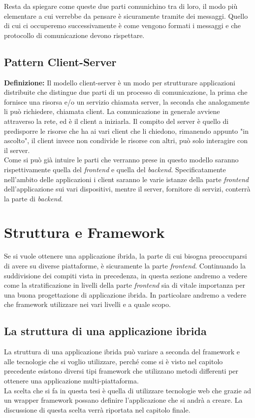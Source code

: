 Resta da spiegare come queste due parti comunichino tra di loro, il modo più elementare a cui verrebbe da pensare è sicuramente tramite dei messaggi. Quello di cui ci occuperemo successivamente è come vengono formati i messaggi e che protocollo di comunicazione devono rispettare.
\subsection{Pattern Client-Server}
\textbf{Definizione:} Il modello client-server è un modo per strutturare applicazioni distribuite che distingue due parti di un processo di comunicazione, la prima che fornisce una risorsa e/o un servizio chiamata server, la seconda che analogamente li può richiedere, chiamata client. La comunicazione in generale avviene attraverso la rete, ed è il client a iniziarla. Il compito del server è quello di predisporre le risorse che ha ai vari client che li chiedono, rimanendo appunto "in ascolto", il client invece non condivide le risorse con altri, può solo interagire con il server\cite{wiki:cliserv}.\\

Come si può già intuire le parti che verranno prese in questo modello saranno rispettivamente quella del \emph{frontend} e quella del \emph{backend}. Specificatamente nell'ambito delle applicazioni i client saranno le varie istanze della parte \emph{frontend} dell'applicazione sui vari dispositivi, mentre il server, fornitore di servizi, conterrà la parte di \emph{backend}.

\section{Struttura e Framework}
Se si vuole ottenere una applicazione ibrida, la parte di cui bisogna preoccuparsi di avere su diverse piattaforme, è sicuramente la parte \emph{frontend}. Continuando la suddivisione dei compiti vista in precedenza, in questa sezione andremo a vedere come la stratificazione in livelli della parte \emph{frontend} sia di vitale importanza per una buona progettazione di applicazione ibrida. In particolare andremo a vedere che framework utilizzare nei vari livelli e a quale scopo.
\subsection{La struttura di una applicazione ibrida}
La struttura di una applicazione ibrida può variare a seconda del framework e alle tecnologie che si voglio utilizzare, perché come si è visto nel capitolo precedente esistono diversi tipi framework che utilizzano metodi differenti per ottenere una applicazione multi-piattaforma.\\
La scelta che si fa in questa tesi è quella di utilizzare tecnologie web che grazie ad un wrapper framework possano definire l'applicazione che si andrà a creare. La discussione di questa scelta verrà riportata nel capitolo finale.

